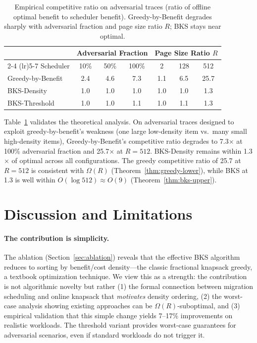 \documentclass{article}
\begin{document}
\begin{table}[t]
\caption{Empirical competitive ratio on adversarial traces (ratio of offline optimal benefit to scheduler benefit). Greedy-by-Benefit degrades sharply with adversarial fraction and page size ratio $R$; BKS stays near optimal.}
\label{tab:adversarial}
\centering
\small
\begin{tabular}{lcccccc}
\toprule
& \multicolumn{3}{c}{Adversarial Fraction} & \multicolumn{3}{c}{Page Size Ratio $R$} \\
\cmidrule(lr){2-4} \cmidrule(lr){5-7}
Scheduler & 10\% & 50\% & 100\% & 2 & 128 & 512 \\
\midrule
Greedy-by-Benefit & 2.4 & 4.6 & 7.3 & 1.1 & 6.5 & 25.7 \\
BKS-Density & 1.0 & 1.0 & 1.0 & 1.0 & 1.0 & 1.3 \\
BKS-Threshold & 1.0 & 1.0 & 1.1 & 1.0 & 1.1 & 1.3 \\
\bottomrule
\end{tabular}
\end{table}

Table~\ref{tab:adversarial} validates the theoretical analysis. On adversarial traces designed to exploit greedy-by-benefit's weakness (one large low-density item vs.\ many small high-density items), Greedy-by-Benefit's competitive ratio degrades to 7.3$\times$ at 100\% adversarial fraction and 25.7$\times$ at $R = 512$. BKS-Density remains within 1.3$\times$ of optimal across all configurations. The greedy competitive ratio of 25.7 at $R = 512$ is consistent with $\Omega(R)$ (Theorem~\ref{thm:greedy-lower}), while BKS at 1.3 is well within $O(\log 512) \approx O(9)$ (Theorem~\ref{thm:bks-upper}).

\section{Discussion and Limitations}
\label{sec:discussion}

\paragraph{The contribution is simplicity.} The ablation (Section~\ref{sec:ablation}) reveals that the effective BKS algorithm reduces to sorting by benefit/cost density---the classic fractional knapsack greedy, a textbook optimization technique. We view this as a strength: the contribution is not algorithmic novelty but rather (1) the formal connection between migration scheduling and online knapsack that \emph{motivates} density ordering, (2) the worst-case analysis showing existing approaches can be $\Omega(R)$-suboptimal, and (3) empirical validation that this simple change yields 7--17\% improvements on realistic workloads. The threshold variant provides worst-case guarantees for adversarial scenarios, even if standard workloads do not trigger it.
\end{document}
